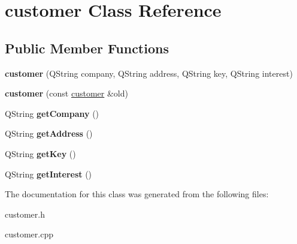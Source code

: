 \hypertarget{classcustomer}{}\section{customer Class Reference}
\label{classcustomer}
\subsection*{Public Member Functions}
\begin{DoxyCompactItemize}
\item 
\mbox{\label{classcustomer_a5634bb18127a7deddfea0323afffd275}} 
{\bfseries customer} (Q\+String company, Q\+String address, Q\+String key, Q\+String interest)
\item 
\mbox{\label{classcustomer_ace8662bdc59605411ff94c7bd119f15a}} 
{\bfseries customer} (const \mbox{\hyperlink{classcustomer}{customer}} \&old)
\item 
\mbox{\label{classcustomer_a42b1873e8a37d03cefd5f709055cf106}} 
Q\+String {\bfseries get\+Company} ()
\item 
\mbox{\label{classcustomer_adcdecf730cce4ec72d0f0e7fa6366bf5}} 
Q\+String {\bfseries get\+Address} ()
\item 
\mbox{\label{classcustomer_a51755d598e47029f9d496851be58a2a4}} 
Q\+String {\bfseries get\+Key} ()
\item 
\mbox{\label{classcustomer_abb319d9aed162ca748db58717a548ee3}} 
Q\+String {\bfseries get\+Interest} ()
\end{DoxyCompactItemize}


The documentation for this class was generated from the following files\+:\begin{DoxyCompactItemize}
\item 
customer.\+h\item 
customer.\+cpp\end{DoxyCompactItemize}
